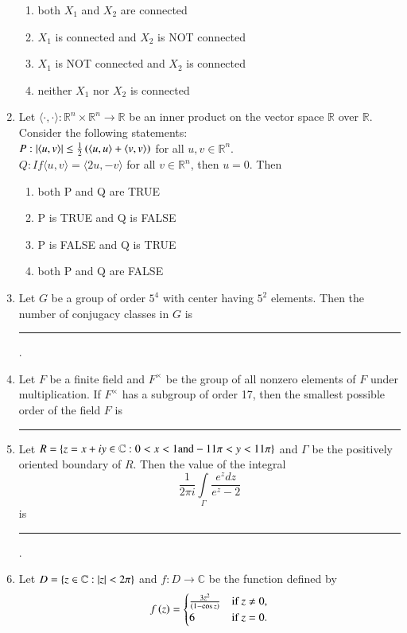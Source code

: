 \documentclass[journal,12pt,onecolumn]{IEEEtran}
\theoremstyle{remark}
\begin{document}
\begin{enumerate}
\begin{enumerate}
\item both $X_1$ and $X_2$ are connected
\item $X_1$ is connected and $X_2$ is NOT connected
\item $X_1$ is NOT connected and $X_2$ is connected
\item neither $X_1$ nor $X_2$ is connected
\end{enumerate}
\item Let $\langle \cdot,\cdot\rangle: \mathbb{R}^n \times \mathbb{R}^n\rightarrow\mathbb{R}$ be an inner product on the vector space $\mathbb{R}$ over $\mathbb{R}$. Consider the following statements:\\
$P: \left\vert\langle u, v\rangle\right\vert \leq \frac{1}{2}\left(\langle u, u\rangle + \langle v, v\rangle\right)$ for all $u, v \in \mathbb{R}^n$.\\
$Q: If \langle u, v\rangle = \langle 2u, - v\rangle$ for all $v\in\mathbb{R}^n$, then $u = 0$. Then
\begin{enumerate}
\item both P and Q are TRUE
\item P is TRUE and Q is FALSE
\item P is FALSE and Q is TRUE
\item both P and Q are FALSE
\end{enumerate}
\item Let $G$ be a group of order $5^4$ with center having $5^2$ elements. Then the number of conjugacy classes in $G$ is \rule{2cm}{0.15mm}.
\item Let $F$ be a finite field and $F^\times$ be the group of all nonzero elements of $F$ under multiplication. If $F^\times$ has a subgroup of order 17, then the smallest possible order of the field $F$ is \rule{2cm}{0.15mm}
\item Let $R= \left\{z = x + iy \in \mathbb{C} : 0 < x < 1 \text{and} - 11\pi < y < 11\pi \right\}$ and $\Gamma$ be the positively oriented boundary of $R$. Then the value of the integral
$$\frac{1}{2\pi i}\int\limits_\Gamma\frac{e^z dz}{e^z -2}$$
is \rule{2cm}{0.15mm}.
\item Let $D = \left\{z \in \mathbb{C} : \left\vert z\right\vert<2\pi\right\}$ and $f:D\rightarrow \mathbb{C}$ be the function defined by\\
$$f\left(z\right) = \begin{cases}
\frac{3z^2}{\left(1-\cos z\right)} & \text{if } z \neq 0, \\
6 & \text{if } z = 0.
\end{cases}$$

\end{enumerate}
\end{document}
